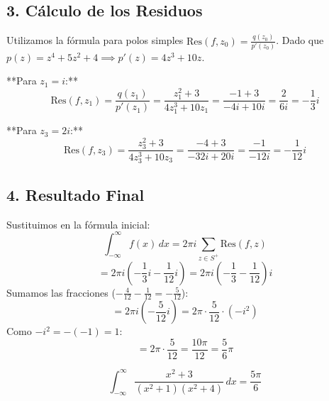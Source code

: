 {\subsection*{3. Cálculo de los Residuos}

Utilizamos la fórmula para polos simples $\text{Res}(f, z_0) = \frac{q(z_0)}{p'(z_0)}$.
Dado que $p(z) = z^4 + 5z^2 + 4 \implies p'(z) = 4z^3 + 10z$.

**Para $z_1 = i$:**
\[
\text{Res}(f, z_1) = \frac{q(z_1)}{p'(z_1)} = \frac{z_1^2 + 3}{4z_1^3 + 10z_1} = \frac{-1 + 3}{-4i + 10i} = \frac{2}{6i} = -\frac{1}{3}i
\]

**Para $z_3 = 2i$:**
\[
\text{Res}(f, z_3) = \frac{z_3^2 + 3}{4z_3^3 + 10z_3} = \frac{-4 + 3}{-32i + 20i} = \frac{-1}{-12i} = -\frac{1}{12}i
\]

\subsection*{4. Resultado Final}

Sustituimos en la fórmula inicial:
\[
\int_{-\infty}^{\infty} f(x) \, dx = 2\pi i \sum_{z \in S^+} \text{Res}(f, z)
\]
\[
= 2\pi i \left( -\frac{1}{3}i - \frac{1}{12}i \right) = 2\pi i \left( -\frac{1}{3} - \frac{1}{12} \right)i
\]
Sumamos las fracciones ($-\frac{4}{12} - \frac{1}{12} = -\frac{5}{12}$):
\[
= 2\pi i \left( -\frac{5}{12} i \right) = 2\pi \cdot \frac{5}{12} \cdot (-i^2)
\]
Como $-i^2 = -(-1) = 1$:
\[
= 2\pi \cdot \frac{5}{12} = \frac{10\pi}{12} = \frac{5}{6}\pi
\]

\[
\boxed{ \int_{-\infty}^{\infty} \frac{x^2+3}{(x^2+1)(x^2+4)} \, dx = \frac{5\pi}{6} }
\]
}
